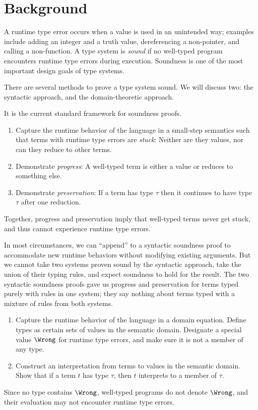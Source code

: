 \documentclass{amsart}
\begin{document}
\section{Background}

A runtime type error occurs when a value is used in an unintended
way; examples include adding an integer and a truth value,
dereferencing a non-pointer, and calling a non-function. A type
system is \emph{sound} if no well-typed program encounters
runtime type errors during execution. Soundness is one of the
most important design goals of type systems.

There are several methods to prove a type system sound. We will
discuss two: the syntactic approach, and the domain-theoretic
approach.


It is the current standard framework for soundness proofs.
\begin{enumerate}
\item Capture the runtime behavior of the language in a
small-step semantics such that terms with runtime type errors are
\emph{stuck}: Neither are they values, nor can they reduce to
other terms.
\item Demonstrate \emph{progress}: A well-typed term is either a
value or reduces to something else.
\item Demonstrate \emph{preservation}: If a term has type $\tau$
then it continues to have type $\tau$ after one reduction.
\end{enumerate}
Together, progress and preservation imply that well-typed terms
never get stuck, and thus cannot experience runtime type errors.

In most circumstances, we can ``append'' to a syntactic soundness
proof to accommodate new runtime behaviors without modifying
existing arguments. But we cannot take two systems proven sound
by the syntactic approach, take the union of their typing rules,
and expect soundness to hold for the result. The two syntactic
soundness proofs gave us progress and preservation for terms
typed purely with rules in one system; they say nothing about
terms typed with a mixture of rules from both systems.


\begin{enumerate}
\item Capture the runtime behavior of the language in a domain
equation. Define types as certain sets of values in the semantic
domain. Designate a special value $\Wrong$ for runtime type
errors, and make sure it is not a member of any type.
\item Construct an interpretation from terms to values in the
semantic domain. Show that if a term $t$ has type $\tau$, then
$t$ interprets to a member of $\tau$.
\end{enumerate}
Since no type contains $\Wrong$, well-typed programs do not
denote $\Wrong$, and their evaluation may not encounter runtime
type errors.
\end{document}
